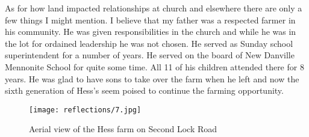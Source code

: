 As for how land impacted relationships at church and elsewhere there are only a few things I might mention.
I believe that my father was a respected farmer in his community.
He was given responsibilities in the church and while he was in the lot for ordained leadership he was not chosen.
He served as Sunday school superintendent for a number of years.
He served on the board of New Danville Mennonite School for quite some time.
All 11 of his children attended there for 8 years.
He was glad to have sons to take over the farm when he left and now the sixth generation of Hess's seem poised to continue the farming opportunity.

\begin{figure}
\centering
\texttt{[image: reflections/7.jpg]}
\caption{
Aerial view of the Hess farm on Second Lock Road
}
\end{figure}







